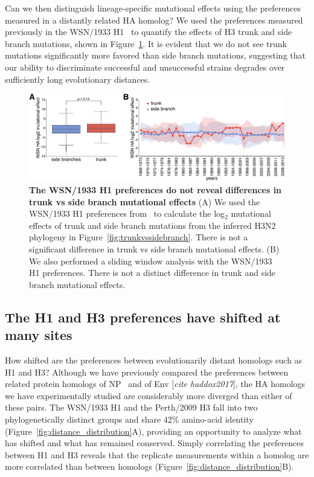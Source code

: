 \documentclass[9pt,twocolumn,twoside]{pnas-new}
\newcommand{\comment}[1]{{\color{red}[\textsl{#1}]}}
\begin{document}
Can we then distinguish lineage-specific mutational effects using the preferences measured in a distantly related HA homolog?
We used the preferences measured previously in the WSN/1933 H1~\citep{doud2016accurate} to quantify the effects of H3 trunk and side branch mutations, shown in Figure~\ref{fig:WSN_trunkvssidebranch}.
It is evident that we do not see trunk mutations significantly more favored than side branch mutations, suggesting that our ability to discriminate successful and unsuccessful strains degrades over sufficiently long evolutionary distances. 

\begin{figure}
\centering
\includegraphics[width=15cm]{figs/WSN_trunkvssidebranch/WSN_trunkvssidebranch.pdf}
\caption{\label{fig:WSN_trunkvssidebranch}
{\bf The WSN/1933 H1 preferences do not reveal differences in trunk vs side branch mutational effects}
(A) We used the WSN/1933 H1 preferences from~\cite{doud2016accurate} to calculate the log$_{2}$ mutational effects of trunk and side branch mutations from the inferred H3N2 phylogeny in Figure~\ref{fig:trunkvssidebranch}.
There is not a significant difference in trunk vs side branch mutational effects.
(B) We also performed a sliding window analysis with the WSN/1933 H1 preferences.
There is not a distinct difference in trunk and side branch mutational effects.
}
\end{figure}

\subsection*{The H1 and H3 preferences have shifted at many sites}
How shifted are the preferences between evolutionarily distant homologs such as H1 and H3?
Although we have previously compared the preferences between related protein homologs of NP~\citep{doud2015site} and of Env \comment{cite haddox2017}, the HA homologs we have experimentally studied are considerably more diverged than either of these pairs.
The WSN/1933 H1 and the Perth/2009 H3 fall into two phylogenetically distinct groups and share 42\% amino-acid identity (Figure~\ref{fig:distance_distribution}A), providing an opportunity to analyze what has shifted and what has remained conserved.
Simply correlating the preferences between H1 and H3 reveals that the replicate measurements within a homolog are more correlated than between homologs (Figure~\ref{fig:distance_distribution}B).
\end{document}
